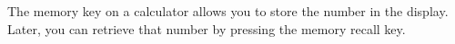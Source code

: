 The memory key on a calculator allows you to store the number in the display. Later, you can retrieve that number by pressing the memory recall key.
